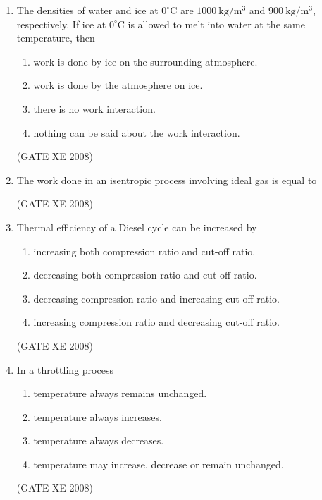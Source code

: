 \documentclass[12pt]{article}
\begin{document}
\begin{enumerate}
(GATE XE 2008)

\item The densities of water and ice at $0^\circ$C are $1000\ \mathrm{kg/m^3}$ and $900\ \mathrm{kg/m^3}$, respectively. If ice at $0^\circ$C is allowed to melt into water at the same temperature, then  

\begin{enumerate}
\item  work is done by ice on the surrounding atmosphere. 
\item  work is done by the atmosphere on ice. 
\item  there is no work interaction. 
\item  nothing can be said about the work interaction.  
\end{enumerate}

(GATE XE 2008)

\item The work done in an isentropic process involving ideal gas is equal to  

\begin{enumerate}
\end{enumerate}

(GATE XE 2008)

\item Thermal efficiency of a Diesel cycle can be increased by  

\begin{enumerate}
\item  increasing both compression ratio and cut-off ratio. 
\item  decreasing both compression ratio and cut-off ratio. 
\item  decreasing compression ratio and increasing cut-off ratio. 
\item  increasing compression ratio and decreasing cut-off ratio.  
\end{enumerate}

(GATE XE 2008)

\item In a throttling process  

\begin{enumerate}
\item  temperature always remains unchanged.
\item  temperature always increases.
\item  temperature always decreases.
\item  temperature may increase, decrease or remain unchanged.  
\end{enumerate}
(GATE XE 2008)


\end{enumerate}
\end{document}
